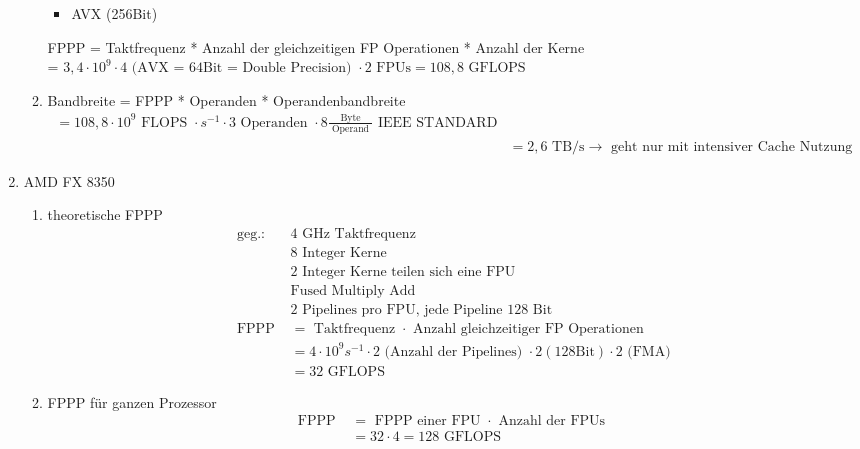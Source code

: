 \begin{enumerate}
\begin{enumerate}
\begin{itemize}
			\item AVX (256Bit)
		\end{itemize}
		FPPP = Taktfrequenz * Anzahl der gleichzeitigen FP Operationen * Anzahl der Kerne\\
		= \(3,4 \cdot 10^9 \cdot 4\text{ (AVX = 64Bit = Double Precision) } \cdot 2 \text{ FPUs} = 108,8 \text{ GFLOPS} \)
		\item Bandbreite = FPPP * Operanden * Operandenbandbreite
		\begin{align*}
			= 108,8 \cdot 10^9 \text{ FLOPS } \cdot s^{-1} \cdot 3 \text{ Operanden } \cdot 8 \frac{\text{ Byte }}{\text{ Operand }}\text{ IEEE STANDARD}\\
			&= 2,6 \text{ TB/s} \to \text{ geht nur mit intensiver Cache Nutzung}
		\end{align*}
	\end{enumerate}
	\item AMD FX 8350
	\begin{enumerate}
		\item theoretische FPPP
		\begin{align*}
		\text{geg.: } &4 \text{ GHz Taktfrequenz}\\
		& 8 \text{ Integer Kerne}\\
		& 2 \text{ Integer Kerne teilen sich eine FPU }\\
		& \text{Fused Multiply Add}\\
		& 2 \text{ Pipelines pro FPU, jede Pipeline 128 Bit }\\
		\text{FPPP } &=  \text{ Taktfrequenz } \cdot \text{  Anzahl gleichzeitiger FP Operationen }\\
		&= 4 \cdot 10^9 s^{-1} \cdot 2 \text{ (Anzahl der Pipelines) } \cdot 2 ( 128\text{Bit}) \cdot 2 \text{ (FMA)} \\
		&= 32 \text{ GFLOPS}
		\end{align*}
		\item FPPP für ganzen Prozessor
		\begin{align*}
		\text{FPPP } &= \text{ FPPP einer FPU } \cdot \text{ Anzahl der FPUs }\\
		&= 32 \cdot 4 = 128 \text{ GFLOPS}
		\end{align*}
	\end{enumerate}
\end{enumerate}